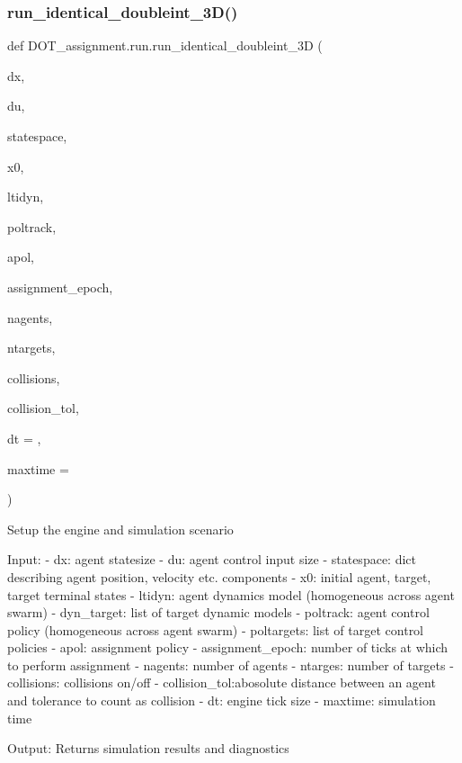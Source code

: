 \subsubsection{\texorpdfstring{run\_identical\_doubleint\_3D()}{run\_identical\_doubleint\_3D()}}
{\footnotesize\ttfamily def D\+O\+T\+\_\+assignment.\+run.\+run\+\_\+identical\+\_\+doubleint\+\_\+3D (\begin{DoxyParamCaption}\item[{}]{dx,  }\item[{}]{du,  }\item[{}]{statespace,  }\item[{}]{x0,  }\item[{}]{ltidyn,  }\item[{}]{poltrack,  }\item[{}]{apol,  }\item[{}]{assignment\+\_\+epoch,  }\item[{}]{nagents,  }\item[{}]{ntargets,  }\item[{}]{collisions,  }\item[{}]{collision\+\_\+tol,  }\item[{}]{dt = {},  }\item[{}]{maxtime = {} }\end{DoxyParamCaption})}

\begin{DoxyVerb}Setup the engine and simulation scenario

Input:
    - dx:           agent statesize
    - du:           agent control input size
    - statespace:   dict describing agent position, velocity etc. components
    - x0:           initial agent, target, target terminal states
    - ltidyn:       agent dynamics model (homogeneous across agent swarm)
    - dyn_target:   list of target dynamic models
    - poltrack:     agent control policy (homogeneous across agent swarm)
    - poltargets:   list of target control policies
    - apol:         assignment policy
    - assignment_epoch: number of ticks at which to perform assignment
    - nagents:      number of agents
    - ntarges:      number of targets
    - collisions:   collisions on/off
    - collision_tol:abosolute distance between an agent and tolerance to count as collision
    - dt:           engine tick size
    - maxtime:      simulation time

Output: Returns simulation results and diagnostics\end{DoxyVerb}
 \mbox{\label{namespace_d_o_t__assignment_1_1run_aa2c67e214eb5e95cc9fb3a874c49da05}} 
